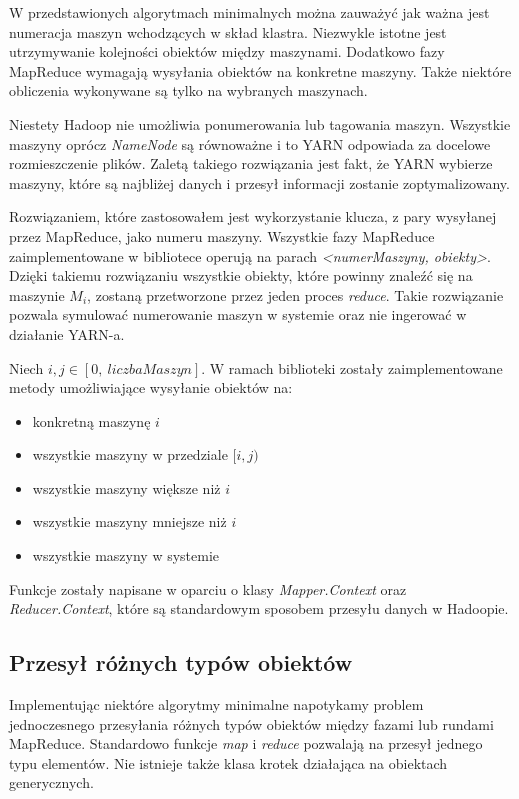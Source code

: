\documentclass{pracamgr}
\begin{document}
W przedstawionych algorytmach minimalnych można zauważyć jak ważna jest numeracja maszyn wchodzących w skład klastra. Niezwykle istotne jest utrzymywanie kolejności obiektów między maszynami. Dodatkowo fazy MapReduce wymagają wysyłania obiektów na konkretne maszyny. Także niektóre obliczenia wykonywane są tylko na wybranych maszynach.

Niestety Hadoop nie umożliwia ponumerowania lub tagowania maszyn. Wszystkie maszyny oprócz \textit{NameNode} są równoważne i to YARN odpowiada za docelowe rozmieszczenie plików. Zaletą takiego rozwiązania jest fakt, że YARN wybierze maszyny, które są najbliżej danych i przesył informacji zostanie zoptymalizowany.

Rozwiązaniem, które zastosowałem jest wykorzystanie klucza, z pary wysyłanej przez MapReduce, jako numeru maszyny. Wszystkie fazy MapReduce zaimplementowane w bibliotece operują na parach \textit{<numerMaszyny, obiekty>}. Dzięki takiemu rozwiązaniu wszystkie obiekty, które powinny znaleźć się na maszynie \(M_i\), zostaną przetworzone przez jeden proces \textit{reduce}. Takie rozwiązanie pozwala symulować numerowanie maszyn w systemie oraz nie ingerować w działanie YARN-a.

Niech \(i, j \in [0, \ liczbaMaszyn]\). W ramach biblioteki zostały zaimplementowane metody umożliwiające wysyłanie obiektów na:
\begin{itemize}
    \item konkretną maszynę \(i\)
    \item wszystkie maszyny w przedziale \([i, j)\)
    \item wszystkie maszyny większe niż \(i\)
    \item wszystkie maszyny mniejsze niż \(i\)
    \item wszystkie maszyny w systemie
\end{itemize}

Funkcje zostały napisane w oparciu o klasy \textit{Mapper.Context} oraz \textit{Reducer.Context}, które są standardowym sposobem przesyłu danych w Hadoopie.

\subsection{Przesył różnych typów obiektów}

Implementując niektóre algorytmy minimalne napotykamy problem jednoczesnego przesyłania różnych typów obiektów między fazami lub rundami MapReduce. Standardowo funkcje \textit{map} i \textit{reduce} pozwalają na przesył jednego typu elementów. Nie istnieje także klasa krotek działająca na obiektach generycznych.
\end{document}
